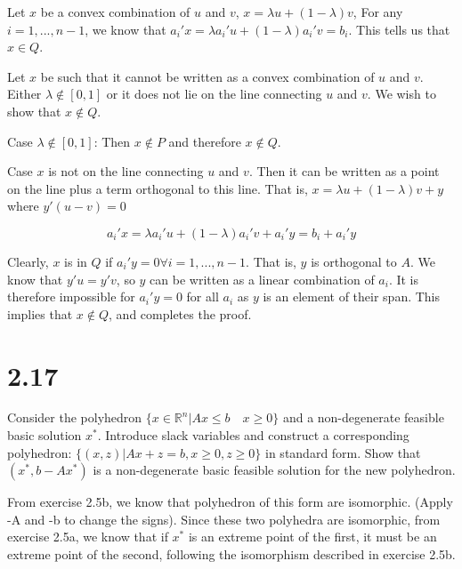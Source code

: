 \documentclass[12pt]{paper}
\newcommand{\setR}{ \mathbb{R} }
\begin{document}
\vspace{.3in}

Let $x$ be a convex combination of $u$ and $v$, $x = \lambda u + (1-\lambda)v$,
For any $i = 1,...,n-1$, we know that $a_i' x = \lambda a_i'u + (1-\lambda)a_i' v =
b_i$. This tells us that $x \in Q$.

Let $x$ be such that it cannot be written as a convex combination of
$u$ and $v$. Either $\lambda \notin [0,1]$ or it does not lie on the line
connecting $u$ and $v$. We wish to show that $x \notin Q$.

Case $\lambda \notin [0,1]$: Then $x \notin P$ and therefore $x \notin Q$.

Case $x$ is not on the line connecting $u$ and $v$. Then it can be
written as a point on the line plus a term orthogonal to this
line. That is, $x = \lambda u + (1-\lambda)v + y$ where $y' ( u - v ) = 0$

\begin{equation*}
 a_i' x = \lambda a_i' u + (1- \lambda)a_i' v + a_i' y = b_i + a_i'y
\end{equation*}

Clearly, $x$ is in $Q$ if $a_i'y = 0 \forall i = 1,...,n-1$.  That is, $y$
is orthogonal to $A$. We know that $y'u = y' v$, so $y$ can be written
as a linear combination of $a_i$. It is therefore impossible for
$a_i'y = 0$ for all $a_i$ as $y$ is an element of their span. This
implies that $x \notin Q$, and completes the proof.

\section{2.17}

Consider the polyhedron $\{ x \in \setR^n \vert Ax \leq b \quad x \geq 0 \}$ and a
non-degenerate feasible basic solution $x^{*}$. Introduce slack
variables and construct a corresponding polyhedron: $\{ (x,z) \vert Ax + z
= b, x \geq 0, z\geq 0\}$ in standard form. Show that $(x^{*},b - Ax^{*})$ is a
non-degenerate basic feasible solution for the new polyhedron.

\vspace{.3in}

From exercise 2.5b, we know that polyhedron of this form are
isomorphic. (Apply -A and -b to change the signs). Since these two
polyhedra are isomorphic, from exercise 2.5a, we know that if $x^{*}$
is an extreme point of the first, it must be an extreme point of the
second, following the isomorphism described in exercise 2.5b.
\end{document}
